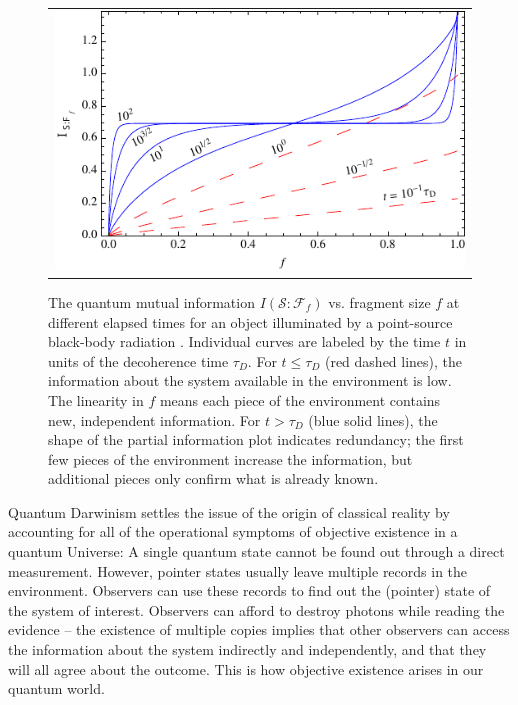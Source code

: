 \documentclass[aps,amsmath,amssymb,amsfonts,floatfix]{revtex4-1}
\newcommand{\Env}{\ensuremath{\mathcal{E}}}
\newcommand{\cS}        {{\mathcal S}}
\newcommand{\cE}        {{\mathcal E}}
\newcommand{\+}         {\dagger}
\newcommand\cF{{\mathcal F}}
\newcommand\hocom[1]{}%
\begin{document}
{{{\begin{figure}[tb]
\begin{tabular}{l}
\includegraphics[width=4.5in]{QMI_plot_a_point_source.pdf}\\
\end{tabular}
\caption{The quantum mutual information $I(\cS : \cF_f )$ vs. fragment size $f$ at different elapsed times for an object illuminated by a point-source black-body radiation \cite{RiedelZ12}.
Individual curves are labeled by the time $t$ in units of the decoherence time $\tau_D$.
For $t \le\tau_D$ (red dashed lines), the information about the system available in the environment is low.  The linearity in $f$ means each piece of the environment contains new, independent information.  For $t>\tau_D$ (blue solid lines), the shape of the partial information plot indicates redundancy; the first few pieces of the environment increase the information, but additional pieces only confirm what is already known. 
\hocom{ The remaining information (i.e. above the plateau) is highly ``encrypted'' in the global state, in the sense that it can only read by capturing almost all of $\Env$ and measuring $\cS\cE$ in the right way. \\
(b) For isotropic illumination, the same time-slicing is used as in (a) but there is greatly decreased mutual information because the directional photon states are ``full'' and cannot store more information about the state of the object.}}
\label{illumination}
\end{figure}

Quantum Darwinism settles the issue of the origin of classical reality by accounting for all of the operational symptoms of objective existence
in a quantum Universe: A single quantum state cannot be found out through a direct
measurement. However, pointer states usually leave multiple records in the environment. Observers can use these
records to find out the (pointer) state of the system of interest. Observers can afford to destroy photons while
reading the evidence -- the existence of multiple copies implies that other observers can access
the information about the system indirectly and independently, and that they will all agree about
the outcome.  This is how objective existence arises in our quantum world. 

}}}
\end{document}
